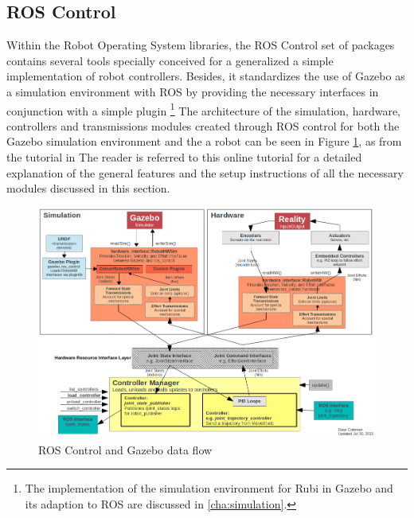 
\subsection{ROS Control} %
\label{sub:ros_control}
Within the Robot Operating System libraries, the ROS Control set of packages \cite{ros_control} contains several tools specially conceived for a generalized a simple implementation of robot controllers.
Besides, it standardizes the use of Gazebo \cite{gazebo} as a simulation environment with ROS by providing the necessary interfaces in conjunction with a simple plugin \footnote{The implementation of the simulation environment for Rubi in Gazebo and its adaption to ROS are discussed in \ref{cha:simulation}.}
The architecture of the simulation, hardware, controllers and transmissions modules created through ROS control for both the Gazebo simulation environment and the a robot can be seen in Figure \ref{fig:ros_control_gazebo}, as from the tutorial in \cite{ros_control_tutorial} The reader is referred to this online tutorial for a detailed explanation of the general features and the setup instructions of all the necessary modules discussed in this section.

\begin{figure}[ht]
	\centering
	\includegraphics[width=\textwidth]{figures/ros_control_gazebo.png} 
	\caption{ROS Control and Gazebo data flow}
	\label{fig:ros_control_gazebo}
\end{figure}

